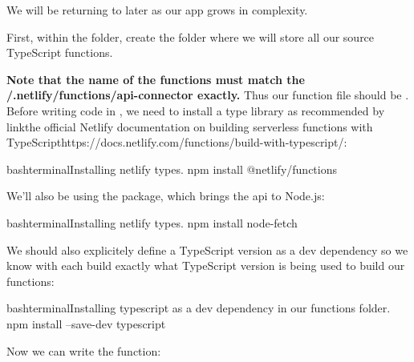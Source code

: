 \documentclass[a4paper,headinclude=on,footinclude=on,12pt,oneside]{scrbook}
\begin{document}
We will be returning to  later as our app grows in complexity.


First, within the  folder, create the  folder where we will store all our source TypeScript functions.

\textbf{Note that the name of the functions must match the /.netlify/functions/api-connector exactly.} Thus our function file should be . Before writing code in , we need to install a type library as recommended by \;link{the official Netlify documentation on building serverless functions with TypeScript}{https://docs.netlify.com/functions/build-with-typescript/}:

\begin{codeInput}{bash}{terminal}{Installing netlify types.}
npm install @netlify/functions
\end{codeInput}

We'll also be using the  package, which brings the  api to Node.js:

\begin{codeInput}{bash}{terminal}{Installing netlify types.}
npm install node-fetch
\end{codeInput}

We should also explicitely define a TypeScript version as a dev dependency so we know with each build exactly what TypeScript version is being used to build our functions:

\begin{codeInput}{bash}{terminal}{Installing typescript as a dev dependency in our functions folder.}
npm install --save-dev typescript
\end{codeInput}

Now we can write the  function:
\end{document}
